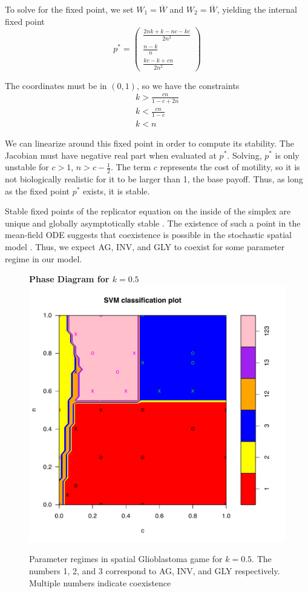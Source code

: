 \documentclass[12pt]{report}
\begin{document}
To solve for the fixed point, we set $W_1 = \overline{W}$ and $W_2 = \overline{W}$, yielding the internal fixed point 
$$p^* = {\begin{pmatrix}\displaystyle{\frac{2 n k + k - n c - k c}{2n^2}}\\
		\displaystyle{\frac{n-k}{n}}\\
		\displaystyle{\frac{k c - k + c n}{2n^2}}
		\end{pmatrix}}$$

The coordinates must be in $(0,1)$, so we have the constraints
\begin{gather}
k > \frac{cn}{1 - c + 2n}\\
k < \frac{cn}{1-c} \\
k < n
\end{gather}


We can linearize around this fixed point in order to compute its stability. The Jacobian must have negative real part when evaluated at $p^*$. Solving, $p^*$ is only unstable for $c > 1$, $n > c - \frac{1}{2}$. The term $c$ represents the cost of motility, so it is not biologically realistic for it to be larger than 1, the base payoff. Thus, as long as the fixed point $p^*$ exists, it is stable.

Stable fixed points of the replicator equation on the inside of the simplex are unique and globally asymptotically stable \cite{Hofbauer1998}. The existence of such a point in the mean-field ODE suggests that coexistence is possible in the stochastic spatial model \cite{Durrett1994}. Thus, we expect AG, INV, and GLY to coexist for some parameter regime in our model. 


\begin{figure}[H]
\centering
\textbf{Phase Diagram for $k = 0.5$}
\includegraphics[width = 0.9 \linewidth]{Diagrams/basanta_phase-cropped}
\caption{Parameter regimes in spatial Glioblastoma game for $k = 0.5$. The numbers 1, 2, and 3 correspond to AG, INV, and GLY respectively. Multiple numbers indicate coexistence}
\end{figure}
\end{document}

